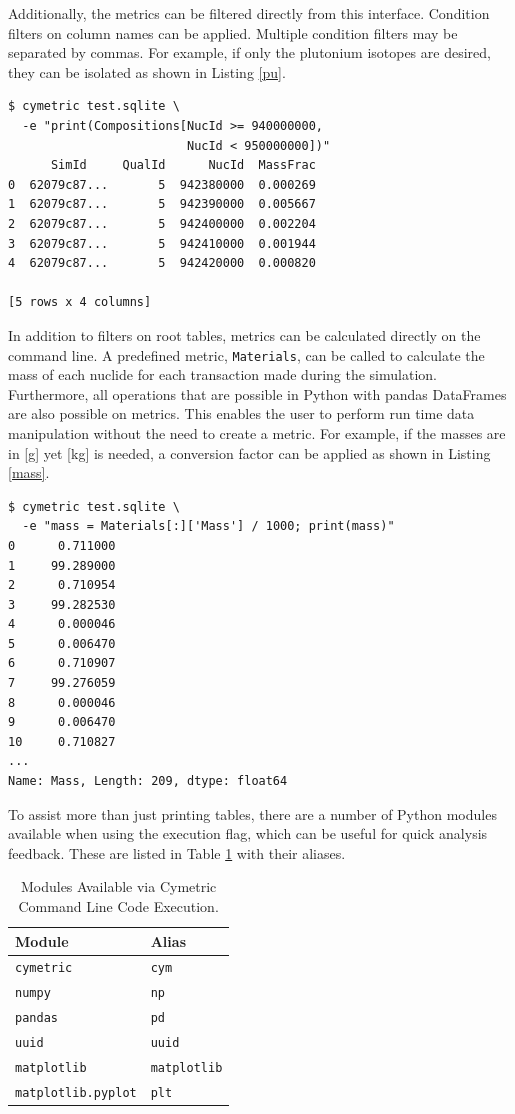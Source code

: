 \documentclass{anstrans}
\newcommand{\code}[1]{{\color{code}\texttt{#1}}}
\begin{document}
Additionally, the metrics can be filtered directly from this interface.
Condition filters on column names can be applied. Multiple condition
filters may be separated by commas. For example, if only the plutonium 
isotopes are desired, they can be isolated as shown in Listing \ref{pu}. 

\begin{lstlisting}[caption ={Filtering a Root Table}, label=pu]
$ cymetric test.sqlite \
  -e "print(Compositions[NucId >= 940000000, 
                         NucId < 950000000])"
      SimId     QualId      NucId  MassFrac
0  62079c87...       5  942380000  0.000269
1  62079c87...       5  942390000  0.005667
2  62079c87...       5  942400000  0.002204
3  62079c87...       5  942410000  0.001944
4  62079c87...       5  942420000  0.000820

[5 rows x 4 columns]
\end{lstlisting}

In addition to filters on root tables, metrics can  be calculated directly 
on the command line. A predefined metric, \code{Materials}, can be called 
to calculate the mass of each nuclide for each transaction made during 
the simulation. Furthermore, all operations that are possible in Python 
with pandas DataFrames are also possible on metrics.  This enables the user
to perform run time data manipulation without the need to create a metric.
For example, if the masses are in [g] yet [kg] is needed, 
a conversion factor can be applied as shown in Listing \ref{mass}.

\begin{lstlisting}[caption ={Calculating and Manipulating Metrics}, label=mass]
$ cymetric test.sqlite \
  -e "mass = Materials[:]['Mass'] / 1000; print(mass)"
0      0.711000
1     99.289000
2      0.710954
3     99.282530
4      0.000046
5      0.006470
6      0.710907
7     99.276059
8      0.000046
9      0.006470
10     0.710827
...
Name: Mass, Length: 209, dtype: float64
\end{lstlisting}

To assist more than just printing tables, there are a number of Python 
modules available when using the execution flag, which can be useful for quick analysis feedback. 
These are listed in Table \ref{tab:modules} with their aliases. 

\begin{table}[htb]
\centering
\caption{Modules Available via Cymetric Command Line Code Execution.}
\begin{tabular}{ll}
\toprule
  Module                   & Alias \\
\midrule
  \code{cymetric}          & \code {cym} \\
  \code{numpy}             & \code{np} \\  
  \code{pandas}            & \code{pd} \\
  \code{uuid}              & \code{uuid} \\
  \code{matplotlib}        & \code{matplotlib} \\
  \code{matplotlib.pyplot} & \code{plt} \\
\bottomrule
\end{tabular}
  \label{tab:modules}
\end{table}
\end{document}
